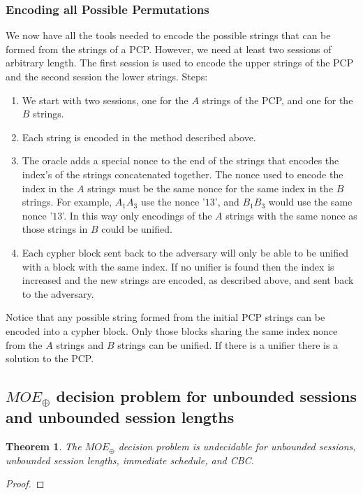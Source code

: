 \documentclass{easychair}
\newtheorem{theorem}{Theorem}
\begin{document}
{\subsubsection{Encoding all Possible Permutations}
We now have all the tools needed to encode the possible 
strings that can be formed from the strings of a PCP. 
However, we need at least two sessions of arbitrary length.
The first session is used to encode the upper strings of the 
PCP and the second session the lower strings. 
Steps:
\begin{enumerate}
	\item We start with two sessions, one for the 
	$A$ strings of the PCP, and one for the $B$ strings.
	\item Each string is encoded in the method described above.
	\item The oracle adds a special 
	nonce to the end of the strings that encodes the index's of the strings concatenated together. The nonce used 
	to encode the index in the $A$ strings must be the same nonce
	for the same index in the $B$ strings. For example, 
	$A_1A_3$ use the nonce '$13$', and $B_1B_3$ would use the same
	nonce '$13$'. In this way only encodings of the $A$ strings with the same nonce as those strings in $B$ could be unified.
	\item Each cypher block sent back to the adversary will only be able to be unified with a block with the same index. 
	If no unifier is found then the index is increased and the 
	new strings are encoded, as described above, and sent back to
	the adversary.  
\end{enumerate}

Notice that any possible string formed from the initial PCP strings 
can be encoded into a cypher block. Only those blocks sharing the
same index nonce from the $A$ strings and $B$ strings can be unified.
If there is a unifier there is a solution to the PCP. 


\subsection{$MOE_{\oplus}$ decision problem for unbounded 
	sessions and unbounded session lengths}
\begin{theorem}\label{thm:unbounded_unbounded}
	The $MOE_{\oplus}$ decision problem is undecidable for unbounded 
	sessions, unbounded session lengths, immediate schedule, and CBC. 
\end{theorem}
\begin{proof}
\end{proof}

}
\end{document}

